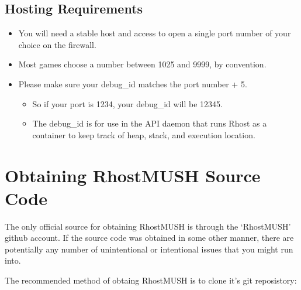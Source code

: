 \documentclass[letterpaper,10pt,english]{sphinxmanual}
\begin{document}
\subsection{Hosting Requirements}
\label{\detokenize{install:hosting-requirements}}\label{\detokenize{install:id5}}\begin{itemize}
\item {} 
\sphinxAtStartPar
You will need a stable host and access to open a single port number of your choice on the firewall.

\item {} 
\sphinxAtStartPar
Most games choose a number between 1025 and 9999, by convention.

\item {} 
\sphinxAtStartPar
Please make sure your debug\_id matches the port number + 5.
\begin{itemize}
\item {} 
\sphinxAtStartPar
So if your port is 1234, your debug\_id will be 12345.

\item {} 
\sphinxAtStartPar
The debug\_id is for use in the API daemon that runs Rhost as a container to keep track of heap, stack, and execution location.

\end{itemize}

\end{itemize}


\section{Obtaining RhostMUSH Source Code}
\label{\detokenize{install:obtaining-rhostmush-source-code}}\label{\detokenize{install:obtaining-rhostmush}}
\sphinxAtStartPar
The only official source for obtaining RhostMUSH is through the ‘RhostMUSH’
github account. If the source code was obtained in some other manner, there
are potentially any number of unintentional or intentional issues that you
might run into.

\sphinxAtStartPar
The recommended method of obtaing RhostMUSH is to clone it’s git reposistory:

\begin{sphinxVerbatim}[commandchars=\\\{\}]
   
\end{sphinxVerbatim}
\end{document}
